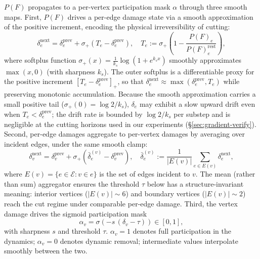 \documentclass[letterpaper, 10 pt, conference]{ieeeconf}  %
\theoremstyle{tight}
\begin{document}
$P(F)$ propagates to a per-vertex participation mask $\alpha$ through
three smooth maps. First, $P(F)$ drives a per-edge damage state via a
smooth approximation of the positive increment, encoding the physical
irreversibility of cutting:
\begin{equation}
  \delta_e^{\text{next}} \!=\! \delta_e^{\text{prev}} +
    \sigma_{\!+}\!\left(T_e - \delta_e^{\text{prev}}\right),
  \quad
  T_e := \sigma_{\!+}\!\left(1 - \frac{P(F)_e}{P(F)_e^{\text{rest}}}\right),
  \label{eq:edge-damage}
\end{equation}
where softplus function $\sigma_{\!+}(x) \!=\! \tfrac{1}{k_s}\log(1 + e^{k_s x})$
smoothly approximates $\max(x, 0)$ (with sharpness $k_s$).
The outer softplus is a differentiable proxy for the positive
increment $[T_e - \delta_e^{\text{prev}}]_+$, so that
$\delta_e^{\text{next}} \!\approx\! \max(\delta_e^{\text{prev}}, T_e)$
while preserving monotonic accumulation. Because the smooth
approximation carries a small positive tail
($\sigma_{\!+}(0) \!=\! \log 2 / k_s$), $\delta_e$ may
exhibit a slow upward drift even when $T_e \!<\! \delta_e^{\text{prev}}$;
the drift rate is bounded by $\log 2 / k_s$ per substep and is
negligible at the cutting horizons used in our experiments
(\S\ref{sec:gradient-verify}).
Second, per-edge damages aggregate to per-vertex damages by averaging
over incident edges, under the same smooth clamp:
\begin{equation}
  \delta_v^{\text{next}} \!=\! \delta_v^{\text{prev}} +
    \sigma_{\!+}\!\left(\bar{\delta}_e^{(v)} -
       \delta_v^{\text{prev}}\right),
  \quad
  \bar{\delta}_e^{(v)} := \frac{1}{|E(v)|}
      \sum_{e \in E(v)} \delta_e^{\text{next}},
  \label{eq:vertex-damage}
\end{equation}
where $E(v) = \{e \in \mathcal{E} : v \in e\}$ is the set of edges
incident to $v$. The mean (rather than sum) aggregator ensures the
threshold $\tau$ below has a structure-invariant meaning: interior
vertices ($|E(v)| \!\sim\! 6$) and boundary vertices
($|E(v)| \!\sim\! 2$) reach the cut regime under comparable per-edge
damage. Third, the vertex damage drives the sigmoid participation
mask
\begin{equation}
  \alpha_v \!=\! \sigma\!\left(-s\,(\delta_v - \tau)\right) \in [0, 1],
  \label{eq:soft-removal}
\end{equation}
with sharpness $s$ and threshold $\tau$. $\alpha_v \!=\! 1$ denotes
full participation in the dynamics; $\alpha_v \!=\! 0$ denotes
dynamic removal; intermediate values interpolate smoothly between the
two.
\end{document}
